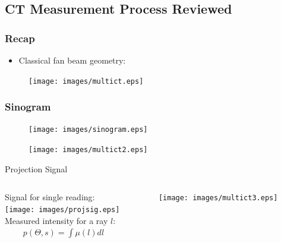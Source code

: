 


\subsection{CT Measurement Process Reviewed}

\begin{frame}
    \frametitle{Recap}
    \begin{itemize}
        \item Classical fan beam geometry:
    \end{itemize}
    \begin{figure}
        \centering{}
        \texttt{[image: images/multict.eps]}
    \end{figure}
\end{frame}

\begin{frame}
    \frametitle{Sinogram}
    \begin{minipage}{0.52\textwidth}
        \begin{figure}
            \centering{}
            \texttt{[image: images/sinogram.eps]}
        \end{figure}
    \end{minipage}
    \begin{minipage}{0.45\textwidth}
        \begin{figure}
            \centering{}
            \texttt{[image: images/multict2.eps]}
        \end{figure}
    \end{minipage}
\end{frame}

\begin{frame}{Projection Signal}

    \begin{columns}[c, onlytextwidth]
        \begin{column}{0.6\textwidth}
            Signal for single reading: \\
            \texttt{[image: images/projsig.eps]}\\
            Measured intensity for a ray $l$:
            \begin{eqnarray*}
                p(\Theta, s) = \int{\mu}(l)dl
            \end{eqnarray*}
        \end{column}\begin{column}{0.4\textwidth}
            \begin{figure}
                \texttt{[image: images/multict3.eps]}
            \end{figure}
        \end{column}
    \end{columns}
\end{frame}

